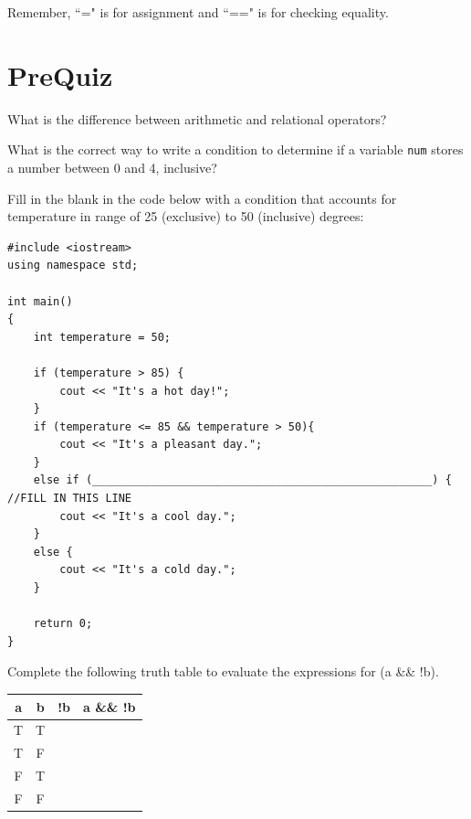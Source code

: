 Remember, ``=" is for assignment and ``==" is for checking equality.

\section{PreQuiz}

\begin{problem}
    What is the difference between arithmetic and relational operators?
\end{problem}

\vspace{4cm}

\begin{problem}
    What is the correct way to write a condition to determine if a variable \texttt{num} stores a number between 0 and 4, inclusive?
\end{problem}

\vspace{4cm}

\begin{problem}
    Fill in the blank in the code below with a condition that accounts for temperature in range of 25 (exclusive) to 50 (inclusive) degrees:
\end{problem}

\begin{verbatim}
#include <iostream>
using namespace std;

int main()
{
    int temperature = 50;

    if (temperature > 85) {
        cout << "It's a hot day!";
    }
    if (temperature <= 85 && temperature > 50){ 
        cout << "It's a pleasant day.";
    }
    else if (____________________________________________________) { //FILL IN THIS LINE
        cout << "It's a cool day.";
    }
    else {
        cout << "It's a cold day.";
    }

    return 0;
}
\end{verbatim}

\begin{problem}
    Complete the following truth table to evaluate the expressions for (a \&\& !b).
\end{problem}

\begin{table}[H]
    \centering
    \begin{tabular}{c|c|c|c}
         a & b & !b & a \&\& !b \\ \hline
         T & T &  &  \\
         T & F &  &  \\
         F & T &  &  \\
         F & F &  &  \\
    \end{tabular}
\end{table}

